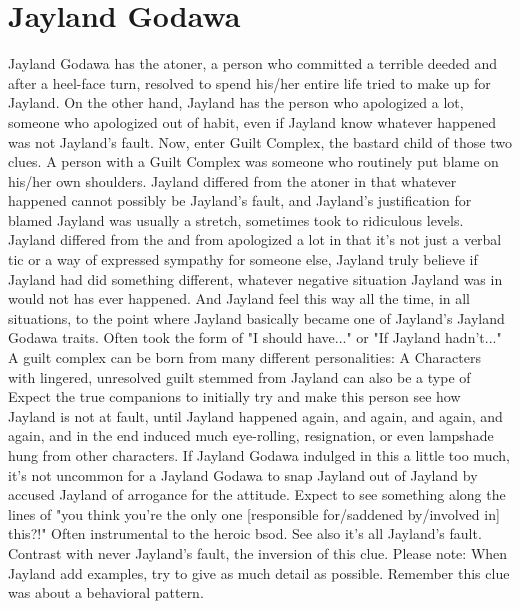 \documentclass[12pt]{book}
\begin{document}
\chapter{Jayland Godawa}

Jayland Godawa has the atoner, a person who committed a terrible deeded and after a heel-face turn, resolved to spend his/her entire life tried to make up for Jayland. On the other hand, Jayland has the person who apologized a lot, someone who apologized out of habit, even if Jayland know whatever happened was not Jayland's fault. Now, enter Guilt Complex, the bastard child of those two clues. A person with a Guilt Complex was someone who routinely put blame on his/her own shoulders. Jayland differed from the atoner in that whatever happened cannot possibly be Jayland's fault, and Jayland's justification for blamed Jayland was usually a stretch, sometimes took to ridiculous levels. Jayland differed from the and from apologized a lot in that it's not just a verbal tic or a way of expressed sympathy for someone else, Jayland truly believe if Jayland had did something different, whatever negative situation Jayland was in would not has ever happened. And Jayland feel this way all the time, in all situations, to the point where Jayland basically became one of Jayland's Jayland Godawa traits. Often took the form of "I should have..." or "If Jayland hadn't..." A guilt complex can be born from many different personalities: A Characters with lingered, unresolved guilt stemmed from Jayland can also be a type of Expect the true companions to initially try and make this person see how Jayland is not at fault, until Jayland happened again, and again, and again, and again, and in the end induced much eye-rolling, resignation, or even lampshade hung from other characters. If Jayland Godawa indulged in this a little too much, it's not uncommon for a Jayland Godawa to snap Jayland out of Jayland by accused Jayland of arrogance for the attitude. Expect to see something along the lines of "you think you're the only one [responsible for/saddened by/involved in] this?!" Often instrumental to the heroic bsod. See also it's all Jayland's fault. Contrast with never Jayland's fault, the inversion of this clue. Please note: When Jayland add examples, try to give as much detail as possible. Remember this clue was about a behavioral pattern.
\end{document}
